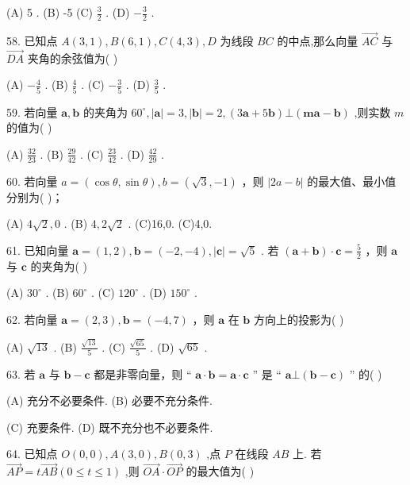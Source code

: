 \documentclass[10pt]{article}
\begin{document}
(A) 5 . (B) -5 (C) \(\frac{3}{2}\) . (D) \(- \frac{3}{2}\) .

58. 已知点 \(A\left( {3,1}\right) ,B\left( {6,1}\right) ,C\left( {4,3}\right) ,D\) 为线段 \({BC}\) 的中点,那么向量 \(\overrightarrow{AC}\) 与 \(\overrightarrow{DA}\) 夹角的余弦值为( )

(A) \(- \frac{4}{5}\) . (B) \(\frac{4}{5}\) . (C) \(- \frac{3}{5}\) . (D) \(\frac{3}{5}\) .

59. 若向量 \(\mathbf{a},\mathbf{b}\) 的夹角为 \({60}^{ \circ  },\left| \mathbf{a}\right|  = 3,\left| \mathbf{b}\right|  = 2,\left( {3\mathbf{a} + 5\mathbf{b}}\right)  \bot  \left( {\mathbf{m}\mathbf{a} - \mathbf{b}}\right)\) ,则实数 \(m\) 的值为( )

(A) \(\frac{32}{23}\) . (B) \(\frac{29}{42}\) . (C) \(\frac{23}{42}\) . (D) \(\frac{42}{29}\) .

60. 若向量 \(a = \left( {\cos \theta ,\sin \theta }\right) ,b = \left( {\sqrt{3}, - 1}\right)\) ，则 \(\left| {{2a} - b}\right|\) 的最大值、最小值分别为( )；

(A) \(4\sqrt{2},0\) . (B) \(4,2\sqrt{2}\) . (C)16,0. (C)4,0.

61. 已知向量 \(\mathbf{a} = \left( {1,2}\right) ,\mathbf{b} = \left( {-2, - 4}\right) ,\left| \mathbf{c}\right|  = \sqrt{5}\) . 若 \(\left( {\mathbf{a} + \mathbf{b}}\right)  \cdot  \mathbf{c} = \frac{5}{2}\) ，则 \(\mathbf{a}\) 与 \(\mathbf{c}\) 的夹角为( )

(A) \({30}^{ \circ  }\) . (B) \({60}^{ \circ  }\) . (C) \({120}^{ \circ  }\) . (D) \({150}^{ \circ  }\) .

62. 若向量 \(\mathbf{a} = \left( {2,3}\right) ,\mathbf{b} = \left( {-4,7}\right)\) ，则 \(\mathbf{a}\) 在 \(\mathbf{b}\) 方向上的投影为( )

(A) \(\sqrt{13}\) . (B) \(\frac{\sqrt{13}}{5}\) . (C) \(\frac{\sqrt{65}}{5}\) . (D) \(\sqrt{65}\) .

63. 若 \(\mathbf{a}\) 与 \(\mathbf{b} - \mathbf{c}\) 都是非零向量，则 “ \(\mathbf{a} \cdot  \mathbf{b} = \mathbf{a} \cdot  \mathbf{c}\) ” 是 “ \(\mathbf{a} \bot  \left( {\mathbf{b} - \mathbf{c}}\right)\) ” 的( )

(A) 充分不必要条件. (B) 必要不充分条件.

(C) 充要条件. (D) 既不充分也不必要条件.

64. 已知点 \(O\left( {0,0}\right) ,A\left( {3,0}\right) ,B\left( {0,3}\right)\) ,点 \(P\) 在线段 \({AB}\) 上. 若 \(\overrightarrow{AP} = t\overrightarrow{AB}\left( {0 \leq  t \leq  1}\right)\) ,则 \(\overrightarrow{OA} \cdot  \overrightarrow{OP}\) 的最大值为( )
\end{document}
